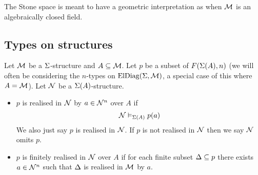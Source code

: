 The Stone space is meant to have a geometric interpretation as 
when $\mathcal{M}$ is an algebraically closed field.

\subsection{Types on structures}
\begin{dfn}[Realisation]
    Let $\mathcal{M}$ be a $\Sigma$-structure and $A \subseteq {\mathcal{M}}$.
    Let $p$ be a subset of $F(\Sigma(A),n)$
    (we will often be considering the $n$-types on $\mathrm{ElDiag}(\Sigma,\mathcal{M})$,
    a special case of this where $A = {\mathcal{M}}$).
    Let $\mathcal{N}$ be a $\Sigma(A)$-structure.
    \begin{itemize}
        \item $p$ is realised in $\mathcal{N}$ by $a \in {\mathcal{N}}^n$ over $A$ if
            \[\mathcal{N} \vDash_{\Sigma(A)} p(a)\]
            We also just say $p$ is realised in $\mathcal{N}$.
            If $p$ is not realised in $\mathcal{N}$
            then we say $\mathcal{N}$ omits $p$.
        \item $p$ is finitely realised in $\mathcal{N}$ 
            over $A$ if for each finite subset $\Delta \subseteq p$ 
            there exists $a \in {\mathcal{N}}^n$
            such that $\Delta$ is realised in $\mathcal{M}$ by $a$.
    \end{itemize}
\end{dfn}

